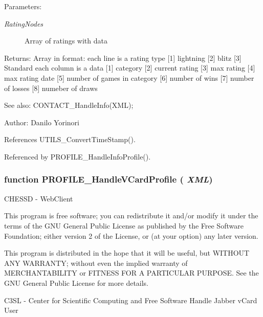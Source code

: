 \begin{Desc}
\item[Parameters:]
\begin{description}
\item[{\em RatingNodes}]Array of ratings with data \end{description}
\end{Desc}
\begin{Desc}
\item[Returns:]Array in format: each line is a rating type [1] lightning [2] blitz [3] Standard each column is a data [1] category [2] current rating [3] max rating [4] max rating date [5] number of games in category [6] number of wins [7] number of losses [8] numeber of draws \end{Desc}
\begin{Desc}
\item[See also:]CONTACT\_\-HandleInfo(XML); \end{Desc}
\begin{Desc}
\item[Author:]Danilo Yorinori \end{Desc}


References UTILS\_\-ConvertTimeStamp().

Referenced by PROFILE\_\-HandleInfoProfile().
\subsubsection{\setlength{\rightskip}{0pt plus 5cm}function PROFILE\_\-HandleVCardProfile ( {\em XML})}\label{profile_2profile_8js_a586925d93cc9cb8533756778acacce2}


CHESSD - WebClient

This program is free software; you can redistribute it and/or modify it under the terms of the GNU General Public License as published by the Free Software Foundation; either version 2 of the License, or (at your option) any later version.

This program is distributed in the hope that it will be useful, but WITHOUT ANY WARRANTY; without even the implied warranty of MERCHANTABILITY or FITNESS FOR A PARTICULAR PURPOSE. See the GNU General Public License for more details.

C3SL - Center for Scientific Computing and Free Software Handle Jabber vCard User

